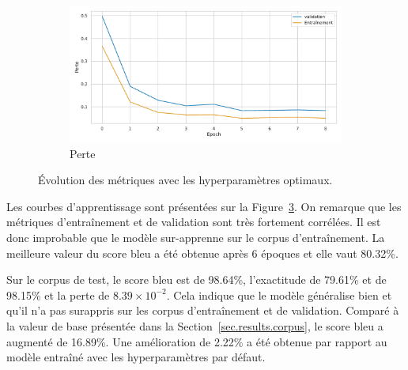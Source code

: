 \begin{figure}[!hbt]
\begin{subfigure}{.5\textwidth}
\begin{center}
        \end{center}
        \label{fig.results.tuned.training.bleu}
    \end{subfigure}
    \begin{subfigure}{.5\textwidth}
        \begin{center}
            \includegraphics[width=\textwidth]{assets/python/tuned-loss.pdf}
        \end{center}
        \caption{Perte}
        \label{fig.results.tuned.training.loss}
    \end{subfigure}
    \caption{Évolution des métriques avec les hyperparamètres optimaux.}
    \label{fig.results.tuned.training}
\end{figure}

Les courbes d'apprentissage sont présentées sur la Figure~\ref{fig.results.tuned.training}.
On remarque que les métriques d'entraînement et de validation sont très fortement corrélées.
Il est donc improbable que le modèle sur-apprenne sur le corpus d'entraînement.
La meilleure valeur du score \gls{bleu} a été obtenue après 6 époques et elle vaut 80.32\%.

Sur le corpus de test, le score \gls{bleu} est de 98.64\%, 
l'exactitude de 79.61\% et de 98.15\% et la perte de \(8.39\times 10^{-2}\).
Cela indique que le modèle généralise bien et qu'il n'a pas surappris sur les corpus d'entraînement et de validation.
Comparé à la valeur de base présentée dans la Section~\ref{sec.results.corpus},
le score \gls{bleu} a augmenté de 16.89\%.
Une amélioration de 2.22\% a été obtenue par rapport au modèle entraîné avec les hyperparamètres par défaut.

